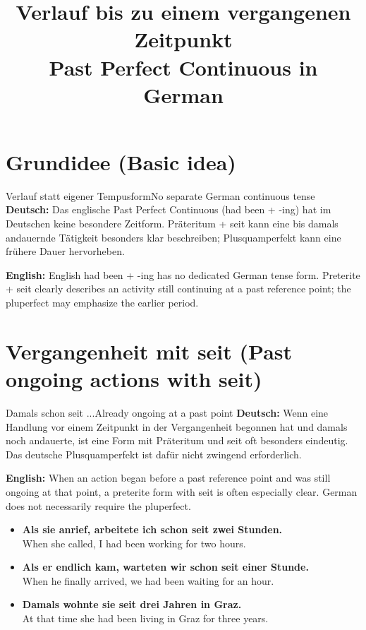\documentclass[a4paper,11pt]{article}
\title{Verlauf bis zu einem vergangenen Zeitpunkt\\\large\textnormal{Past Perfect Continuous in German}}
\date{}
\newcommand{\GermanText}[1]{\textbf{Deutsch: }#1\par}
\newcommand{\EnglishText}[1]{{\small\color{SoftGray}\textbf{English: }#1\par}}
\newcommand{\ExampleItem}[2]{\item \textbf{#1}\\{\small\color{SoftGray}#2}}
\begin{document}
    \maketitle
    \tableofcontents
    \newpage


\section{Grundidee \textnormal{(Basic idea)}}
\begin{grammarentry}{Verlauf statt eigener Tempusform}{No separate German continuous tense}
\GermanText{Das englische Past Perfect Continuous (had been + -ing) hat im Deutschen keine besondere Zeitform. Präteritum + seit kann eine bis damals andauernde Tätigkeit besonders klar beschreiben; Plusquamperfekt kann eine frühere Dauer hervorheben.}
\EnglishText{English had been + -ing has no dedicated German tense form. Preterite + seit clearly describes an activity still continuing at a past reference point; the pluperfect may emphasize the earlier period.}
\end{grammarentry}

\section{Vergangenheit mit seit \textnormal{(Past ongoing actions with seit)}}
\begin{grammarentry}{Damals schon seit ...}{Already ongoing at a past point}
\GermanText{Wenn eine Handlung vor einem Zeitpunkt in der Vergangenheit begonnen hat und damals noch andauerte, ist eine Form mit Präteritum und seit oft besonders eindeutig. Das deutsche Plusquamperfekt ist dafür nicht zwingend erforderlich.}
\EnglishText{When an action began before a past reference point and was still ongoing at that point, a preterite form with seit is often especially clear. German does not necessarily require the pluperfect.}
\end{grammarentry}
\begin{exbox}
\begin{itemize}
\ExampleItem{Als sie anrief, arbeitete ich schon seit zwei Stunden.}{When she called, I had been working for two hours.}
\ExampleItem{Als er endlich kam, warteten wir schon seit einer Stunde.}{When he finally arrived, we had been waiting for an hour.}
\ExampleItem{Damals wohnte sie seit drei Jahren in Graz.}{At that time she had been living in Graz for three years.}
\end{itemize}
\end{exbox}
\end{document}
